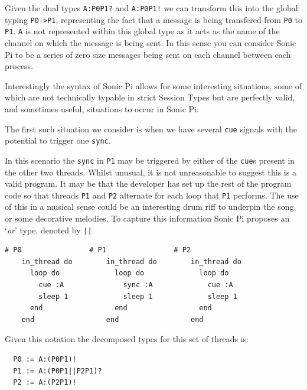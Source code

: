 \documentclass[11pt, abstracton, twoside, titlepage=true]{scrartcl}
\begin{document}
Given the dual types \texttt{A:P0P1?} and \texttt{A:P0P1!} we can transform 
this into the global typing \texttt{P0->P1}, representing the fact that a 
message is being transfered from \texttt{P0} to \texttt{P1}. \texttt{A} is not
represented within this global type as it acts as the name of the channel on
which the message is being sent. In this sense you can consider Sonic Pi
to be a series of zero size messages being sent on each channel between
each process.

Interestingly the syntax of Sonic Pi allows for some interesting situations,
some of which are not technically typable in strict Session Types but are
perfectly valid, and sometimes useful, situations to occur in Sonic Pi.

The first such situation we consider is when we have several \texttt{cue}
signals with the potential to trigger one \texttt{sync}.

In this scenario the \texttt{sync} in \texttt{P1} may be triggered by either
of the \texttt{cue}s present in the other two threads. Whilst unusual,
it is not unreasonable to suggest this is a valid program. It may be that the
developer has set up the rest of the program code so that threads \texttt{P1} 
and \texttt{P2} alternate for each loop that \texttt{P1} performs. The use
of this in a musical sense could be an interesting drum riff to underpin the
song, or some decorative melodies. To capture this information Sonic Pi 
proposes an `\emph{or}' type, denoted by \texttt{||}. 


\begin{minipage}{\textwidth}
	\begin{lstlisting}[style = sonicpi]
    # P0                # P1                # P2
    in_thread do        in_thread do        in_thread do
      loop do             loop do             loop do
        cue :A              sync :A             cue :A
        sleep 1             sleep 1             sleep 1
      end                 end                 end
    end                 end                 end
	\end{lstlisting}
\end{minipage}


Given this notation the
decomposed types for this set of threads is:
\\
\begin{lstlisting}
  P0 := A:(P0P1)!
  P1 := A:(P0P1||P2P1)?
  P2 := A:(P2P1)!
\end{lstlisting}
\end{document}
